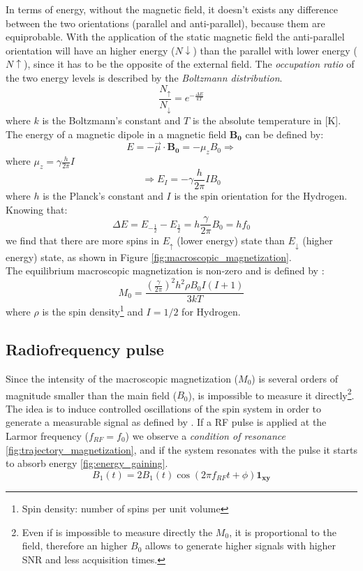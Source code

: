  \noindent In terms of energy, without the magnetic field, it doesn't exists any difference between the two orientations (parallel and anti-parallel), because them are equiprobable. With the application of the static magnetic field the anti-parallel orientation will have an higher energy ($N\downarrow$) than the parallel with lower energy ($N\uparrow$), since it has to be the opposite of the external field. The \emph{occupation ratio} of the two energy levels is described by the \emph{Boltzmann distribution}.
 \begin{equation}
    \frac{N_\uparrow}{N_\downarrow}=e^{-\frac{\Delta E}{k T}}
 \end{equation}
 where $k$ is the Boltzmann's constant and $T$ is the absolute temperature in [K].\\
 The energy of a magnetic dipole in a magnetic field $\mathbf{B_0}$ can be defined by:
 \[E=-\vec{\mu}\cdot\mathbf{B_0}=-\mu_z B_0 \Rightarrow\]
 where $\mu_z=\gamma\frac{h}{2\pi}I$ 
 \[\Rightarrow E_I=-\gamma\frac{h}{2\pi}I B_0\]
 where $h$ is the Planck's constant and $I$ is the spin orientation for the Hydrogen.
 Knowing that:
 \[\Delta E=E_{-\frac{1}{2}} - E_{\frac{1}{2}} = h\frac{\gamma}{2\pi}B_0 = h f_0\]
 we find that there are more spins in $E_\uparrow$ (lower energy) state than $E_\downarrow$ (higher energy) state, as shown in Figure \ref{fig:macroscopic_magnetization}.\\
 The equilibrium macroscopic magnetization is non-zero and is defined by \cite{slides}:
 \begin{equation}
    M_0=\frac{(\frac{\gamma}{2\pi})^{2}h^{2}\rho B_{0}I (I+1)}{3kT}
 \end{equation}
 where $\rho$ is the spin density\footnote{Spin density: number of spins per unit volume} and $I = 1/2$ for Hydrogen.

 \subsection{Radiofrequency pulse}
 Since the intensity of the macroscopic magnetization ($M_0$) is several orders of magnitude smaller than the main field ($B_0$), is impossible to measure it directly\footnote{Even if is impossible to measure directly the $M_0$, it is proportional to the field, therefore an higher $B_0$ allows to generate higher signals with higher SNR and less acquisition times.}.\\
 The idea is to induce controlled oscillations of the spin system in order to generate a measurable signal as defined by \cite{slides}. If a RF pulse is applied at the Larmor frequency ($f_{RF} = f_0$) we observe a \emph{condition of resonance} \ref{fig:trajectory_magnetization}, and if the system resonates with the pulse it starts to absorb energy \ref{fig:energy_gaining}.
 \begin{equation}
    B_{1}(t)=2B_{1}(t)\cos(2\pi f_{RF}t+\phi)\mathbf{1_{xy}}
 \end{equation}


